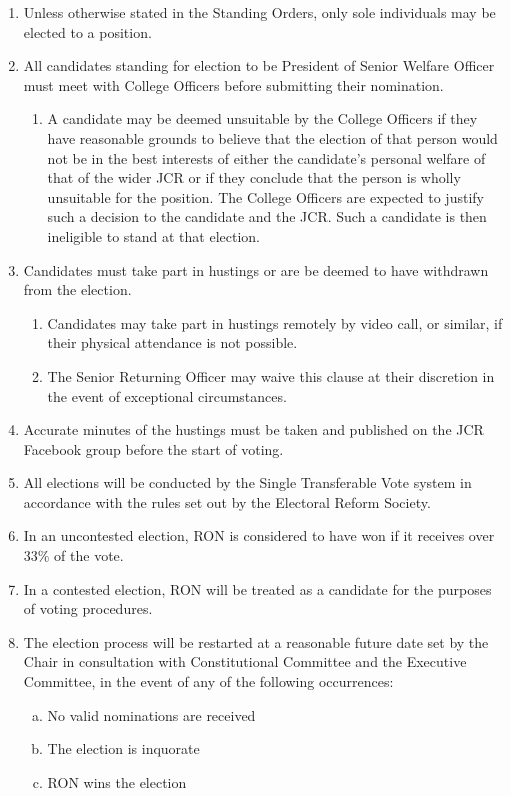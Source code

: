 \documentclass[12pt]{article}  %
\begin{document}
\begin{enumerate}
    \item Unless otherwise stated in the Standing Orders, only sole individuals may be elected to a position.
    \item All candidates standing for election to be President of Senior Welfare Officer must meet with College Officers before submitting their nomination.
    \begin{enumerate}
        \item A candidate may be deemed unsuitable by the College Officers if they have reasonable grounds to believe that the election of that person would not be in the best interests of either the candidate’s personal welfare of that of the wider JCR or if they conclude that the person is wholly unsuitable for the position. The College Officers are expected to justify such a decision to the candidate and the JCR. Such a candidate is then ineligible to stand at that election. 
    \end{enumerate}
    \item Candidates must take part in hustings or are be deemed to have withdrawn from the election.
    \begin{enumerate}
        \item Candidates may take part in hustings remotely by video call, or similar, if their physical attendance is not possible.
        \item The Senior Returning Officer may waive this clause at their discretion in the event of exceptional circumstances.
    \end{enumerate}
    \item Accurate minutes of the hustings must be taken and published on the JCR Facebook group before the start of voting.
    \item All elections will be conducted by the Single Transferable Vote system in accordance with the rules set out by the Electoral Reform Society.
    \item In an uncontested election, RON is considered to have won if it receives over 33\% of the vote.
    \item In a contested election, RON will be treated as a candidate for the purposes of voting procedures.
    \item The election process will be restarted at a reasonable future date set by the Chair in consultation with Constitutional Committee and the Executive Committee, in the event of any of the following occurrences:
    \begin{enumerate}[(a)]
        \item No valid nominations are received
        \item The election is inquorate
        \item RON wins the election
    \end{enumerate}

\end{enumerate}
\end{document}
